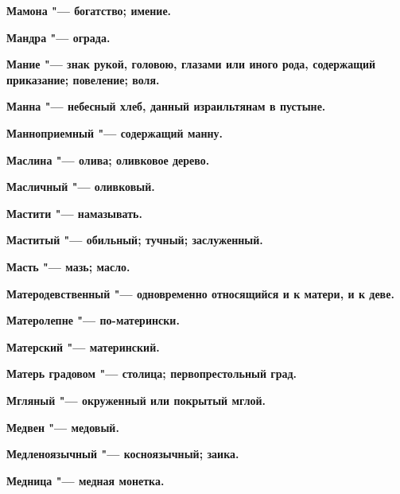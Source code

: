 \begin{multicols}{2}
\bfseries Мамона\normalfont{} "--- богатство; имение. 




\bfseries Мандра\normalfont{} "--- ограда. 




\bfseries Мание\normalfont{} "--- знак рукой, головою, глазами или иного рода, содержащий приказание; повеление; воля. 




\bfseries Манна\normalfont{} "--- небесный хлеб, данный израильтянам в пустыне. 




\bfseries Манноприемный\normalfont{} "--- содержащий манну. 




\bfseries Маслина\normalfont{} "--- олива; оливковое дерево. 




\bfseries Масличный\normalfont{} "--- оливковый. 




\bfseries Мастити\normalfont{} "--- намазывать. 




\bfseries Маститый\normalfont{} "--- обильный; тучный; заслуженный. 




\bfseries Масть\normalfont{} "--- мазь; масло. 




\bfseries Матеродевственный\normalfont{} "--- одновременно относящийся и к матери, и к деве. 




\bfseries Матеролепне\normalfont{} "--- по-матерински. 




\bfseries Матерский\normalfont{} "--- материнский. 




\bfseries Матерь градовом\normalfont{} "--- столица; первопрестольный град. 




\bfseries Мгляный\normalfont{} "--- окруженный или покрытый мглой. 




\bfseries Медвен\normalfont{} "--- медовый. 




\bfseries Медленоязычный\normalfont{} "--- косноязычный; заика. 




\bfseries Медница\normalfont{} "--- медная монетка. 





\end{multicols}

